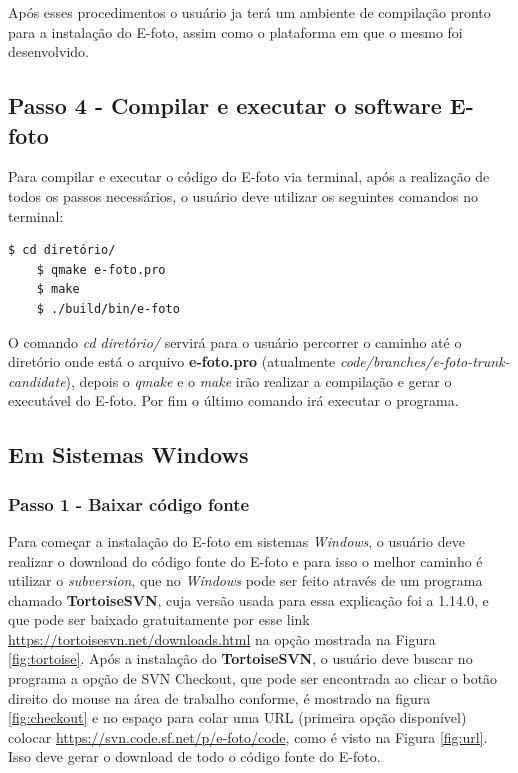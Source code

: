Após esses procedimentos o usuário ja terá um ambiente de compilação pronto para a instalação do E-foto, assim como o plataforma em que o mesmo foi desenvolvido.
    
\subsection{Passo 4 - Compilar e executar o software E-foto}
Para compilar e executar o código do E-foto via terminal, após a realização de todos os passos necessários, o usuário deve utilizar os seguintes comandos no terminal:
\begin{lstlisting}[language=bash]
   	$ cd diretório/
   	$ qmake e-foto.pro
   	$ make
   	$ ./build/bin/e-foto
\end{lstlisting}
   
O comando \textit{cd diretório/} servirá para o usuário percorrer o caminho até o diretório onde está o arquivo \textbf{e-foto.pro} (atualmente \textit{code/branches/e-foto-trunk-candidate}), depois o \textit{qmake} e o \textit{make} irão realizar a compilação e gerar o executável do E-foto. Por fim o último comando irá executar o programa.

\subsection{Em Sistemas Windows}

\subsubsection{Passo 1 - Baixar código fonte}
Para começar a instalação do E-foto em sistemas \textit{Windows}, o usuário deve realizar o download do código fonte do E-foto e para isso o melhor caminho é utilizar o \textit{subversion}, que no \textit{Windows} pode ser feito através de um programa chamado \textbf{TortoiseSVN}, cuja versão usada para essa explicação foi a 1.14.0, e que pode ser baixado gratuitamente por esse link \url{https://tortoisesvn.net/downloads.html} na opção mostrada na Figura \ref{fig:tortoise}. Após a instalação do \textbf{TortoiseSVN}, o usuário deve buscar no programa a opção de SVN Checkout, que pode ser encontrada ao clicar o botão direito do mouse na área de trabalho conforme, é mostrado na figura \ref{fig:checkout} e no espaço para colar uma URL (primeira opção disponível) colocar \url{https://svn.code.sf.net/p/e-foto/code}, como é visto na Figura \ref{fig:url}. Isso deve gerar o download de todo o código fonte do E-foto.

